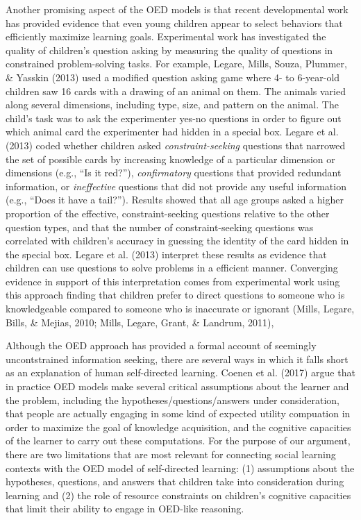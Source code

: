 \documentclass[a4paper,man,apacite,floatsintext]{apa6}
\begin{document}
Another promising aspect of the OED models is that recent developmental
work has provided evidence that even young children appear to select
behaviors that efficiently maximize learning goals. Experimental work
has investigated the quality of children's question asking by measuring
the quality of questions in constrained problem-solving tasks. For
example, Legare, Mills, Souza, Plummer, \& Yasskin (2013) used a
modified question asking game where 4- to 6-year-old children saw 16
cards with a drawing of an animal on them. The animals varied along
several dimensions, including type, size, and pattern on the animal. The
child's task was to ask the experimenter yes-no questions in order to
figure out which animal card the experimenter had hidden in a special
box. Legare et al. (2013) coded whether children asked
\emph{constraint-seeking} questions that narrowed the set of possible
cards by increasing knowledge of a particular dimension or dimensions
(e.g., ``Is it red?''), \emph{confirmatory} questions that provided
redundant information, or \emph{ineffective} questions that did not
provide any useful information (e.g., ``Does it have a tail?''). Results
showed that all age groups asked a higher proportion of the effective,
constraint-seeking questions relative to the other question types, and
that the number of constraint-seeking questions was correlated with
children's accuracy in guessing the identity of the card hidden in the
special box. Legare et al. (2013) interpret these results as evidence
that children can use questions to solve problems in a efficient manner.
Converging evidence in support of this interpretation comes from
experimental work using this approach finding that children prefer to
direct questions to someone who is knowledgeable compared to someone who
is inaccurate or ignorant (Mills, Legare, Bills, \& Mejias, 2010; Mills,
Legare, Grant, \& Landrum, 2011),

Although the OED approach has provided a formal account of seemingly
uncontstrained information seeking, there are several ways in which it
falls short as an explanation of human self-directed learning. Coenen et
al. (2017) argue that in practice OED models make several critical
assumptions about the learner and the problem, including the
hypotheses/questions/answers under consideration, that people are
actually engaging in some kind of expected utility compuation in order
to maximize the goal of knowledge acquisition, and the cognitive
capacities of the learner to carry out these computations. For the
purpose of our argument, there are two limitations that are most
relevant for connecting social learning contexts with the OED model of
self-directed learning: (1) assumptions about the hypotheses, questions,
and answers that children take into consideration during learning and
(2) the role of resource constraints on children's cognitive capacities
that limit their ability to engage in OED-like reasoning.
\end{document}
